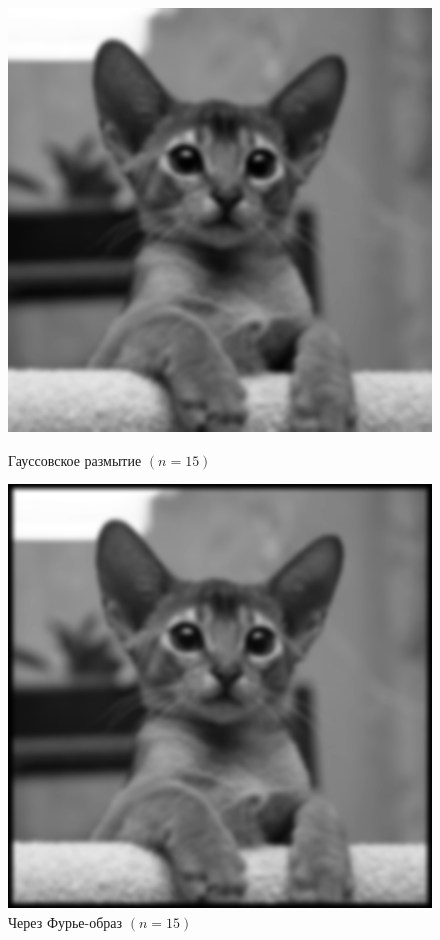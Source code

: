 \documentclass[a4paper]{article}
\begin{document}
\begin{figure}[H]
    \hspace{5em}
    \begin{minipage}{0.35\textwidth}
        \includegraphics[width=\textwidth]{sources/2second/gauss_15.png}
        \caption{Гауссовское размытие $(n = 15)$}
    \end{minipage}\hfill
    \begin{minipage}{0.35\textwidth}
        \includegraphics[width=\textwidth]{sources/2second/gauss_fft_15.png}
        \caption{Через Фурье-образ $(n = 15)$}
    \end{minipage}
    \hspace{5em}
\end{figure}
\end{document}
